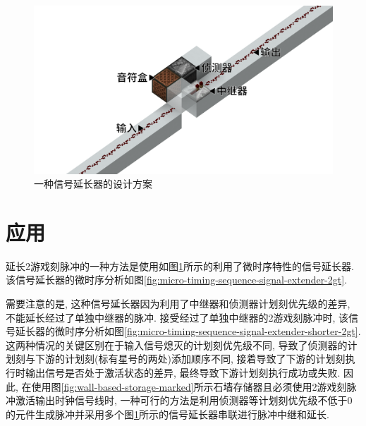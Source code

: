 \documentclass[UTF8,12pt,punct=kaiming,fontset=none]{ctexart}
\begin{document}
\begin{figure}[t]
    \centering
    \includegraphics[width=0.75\linewidth]{figures/signal-extender.png}
    \caption{一种信号延长器的设计方案}
    \label{fig:signal-extender}
\end{figure}

\section{应用}
延长2游戏刻脉冲的一种方法是使用如图\ref{fig:signal-extender}所示的利用了微时序特性的信号延长器. 该信号延长器的微时序分析如图\ref{fig:micro-timing-sequence-signal-extender-2gt}.

需要注意的是, 这种信号延长器因为利用了中继器和侦测器计划刻优先级的差异, 不能延长经过了单独中继器的脉冲. 接受经过了单独中继器的2游戏刻脉冲时, 该信号延长器的微时序分析如图\ref{fig:micro-timing-sequence-signal-extender-shorter-2gt}. 这两种情况的关键区别在于输入信号熄灭的计划刻优先级不同, 导致了侦测器的计划刻与下游的计划刻(标有星号的两处)添加顺序不同, 接着导致了下游的计划刻执行时输出信号是否处于激活状态的差异, 最终导致下游计划刻执行成功或失败. 因此, 在使用图\ref{fig:wall-based-storage-marked}所示石墙存储器且必须使用2游戏刻脉冲激活输出时钟信号线时, 一种可行的方法是利用侦测器等计划刻优先级不低于0的元件生成脉冲并采用多个图\ref{fig:signal-extender}所示的信号延长器串联进行脉冲中继和延长.
\end{document}
